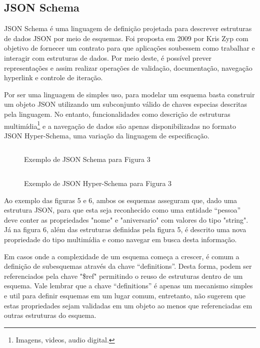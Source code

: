 \subsection[JSON Schema]{JSON Schema}

JSON Schema é uma linguagem de definição projetada para descrever estruturas de dados JSON por meio de esquemas. Foi proposta em 2009 por Kris Zyp com objetivo de fornecer um contrato para que aplicações soubessem como trabalhar e interagir com estruturas de dados. Por meio deste, é possível prever representações e assim realizar operações de validação, documentação, navegação hyperlink e controle de iteração.

Por ser uma linguagem de simples uso, para modelar um esquema basta construir um objeto JSON utilizando um subconjunto válido de chaves especias descritas pela linguagem. No entanto, funcionalidades como descrição de estruturas multimídia\footnote{
  Imagens, videos, audio digital.
} e a navegação de dados são apenas disponibilizadas no formato JSON Hyper-Schema, uma variação da linguagem de especificação. \cite{Jackson2016}

\begin{figure}[H]
  \centering
  \inputminted[frame=single,framesep=10pt]{javascript}{anexos/pessoa-schema.json}
  \caption{Exemplo de JSON Schema para Figura 3}
\end{figure}

\begin{figure}[H]
  \centering
  \inputminted[frame=single,framesep=10pt]{javascript}{anexos/pessoa-hyper-schema.json}
  \caption{Exemplo de JSON Hyper-Schema para Figura 3}
\end{figure}

Ao exemplo das figuras 5 e 6, ambos os esquemas asseguram que, dado uma estrutura JSON, para que esta seja reconhecido como uma entidade “pessoa” deve conter as propriedades "nome" e "aniversario" com valores do tipo "string". Já na figura 6, além das estruturas definidas pela figura 5, é descrito uma nova propriedade do tipo multimídia e como navegar em busca desta informação.

Em casos onde a complexidade de um esquema começa a crescer, é comum a definição de subesquemas através da chave “definitions”. Desta forma, podem ser referenciados pela chave "\$ref" permitindo o reuso de estruturas dentro de um esquema. Vale lembrar que a chave “definitions” é apenas um mecanismo simples e util para definir esquemas em um lugar comum, entretanto, não sugerem que estas propriedades sejam validadas em um objeto ao menos que referenciadas em outras estruturas do esquema. \cite{Leach2014}

